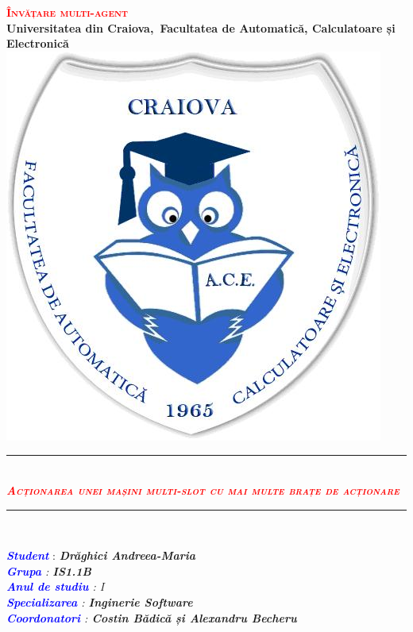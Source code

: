 \documentclass{article}
\begin{document}
\renewcommand{\listfigurename} {\centering \textcolor{red}{Lista Figurilor}}
\renewcommand{\listtablename}{\centering \textcolor{red}{Lista Tabelelor}}
\slshape
\normalsize
\upshape
\sffamily
\begin{titlepage}
\newcommand{\HRule}{\rule{\linewidth}{0,5mm}}
\begin{center}
    \textcolor{red}{\textsc{\huge\scshape\textbf{Învățare multi-agent}}}\\[0.4cm]
    \vspace{15mm}
    \textbf{Universitatea din Craiova,\ Facultatea de Automatică, Calculatoare și Electronică}\\
    \vspace{10mm}
    \textbf{\includegraphics[scale=0.4]{logo-ace.jpg}}
    \vspace{5mm}
\end{center}
\begin{center}
\HRule\\[0,4cm]
\textcolor{red}{\textsc{\Large\itshape{\textbf{Acționarea unei mașini multi-slot cu mai multe brațe de acționare}}}}
\HRule\\[0,4cm]
	\vspace{30mm}
	\end{center}
	\begin{minipage}{1\textwidth}
			\Large
			  \textcolor{blue}{\itshape\textbf{Student}} : \itshape{\textbf{Drăghici Andreea-Maria}}\\[0.3cm] 
			  \textcolor{blue}{\textbf{Grupa}} : \itshape{\textbf{IS1.1B}}\\[0.3cm] 
			  \textcolor{blue}{\textbf{Anul de studiu}} : \itshape{I}\\[0.3cm] 
			  \textcolor{blue}{\itshape{}\textbf{Specializarea}} : \itshape{\textbf{Inginerie Software}\\[0.3cm] 
              \textcolor{blue}{\itshape{}\textbf{Coordonatori}} : \itshape{\textbf{Costin Bădică și Alexandru Becheru}}}\\[1cm]
	\end{minipage}
\end{titlepage}
\end{document}
